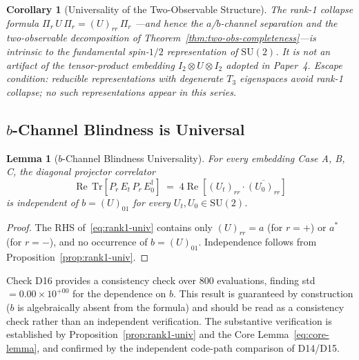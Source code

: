 \documentclass[12pt]{article}
\numberwithin{equation}{section}
\theoremstyle{plain}
\newtheorem{lemma}{Lemma}[section]
\newtheorem{corollary}{Corollary}[section]
\theoremstyle{definition}
\theoremstyle{remark}
\newcommand{\su}{\mathrm{SU}}              %
\newcommand{\tr}{\mathrm{Tr}}              %
\newcommand{\Pir}{\Pi_{r}}                 %
\begin{document}
	\begin{corollary}[Universality of the Two-Observable Structure]
		\label{cor:intrinsic}
		The rank-1 collapse formula $\Pir\, U\,\Pir = (U)_{rr}\,\Pir$
		---and hence the $a$/$b$-channel separation and the
		two-observable decomposition of
		Theorem~\ref{thm:two-obs-completeness}---is intrinsic to the
		fundamental spin-$1/2$ representation of $\su(2)$.  It is not an
		artifact of the tensor-product embedding $I_{2}\otimes U\otimes
		I_{2}$ adopted in Paper~4.
		\emph{Escape condition:} reducible representations with degenerate
		$T_{3}$ eigenspaces avoid rank-1 collapse; no such representations
		appear in this series.
	\end{corollary}
	
	\subsection{\texorpdfstring{$b$}{b}-Channel Blindness is Universal}
	\label{sec:b-blindness}
	
	\begin{lemma}[$b$-Channel Blindness Universality]
		\label{lem:b-blindness}
		For every embedding Case A, B, C, the diagonal projector
		correlator
		\[
		\operatorname{Re}\,\tr\!\left[P_{r}\, E_{t}\, P_{r}\,
		E_{0}^{\dagger}\right]
		\;=\; 4\operatorname{Re}\!\left[(U_{t})_{rr}\cdot
		\overline{(U_{0})_{rr}}\right]
		\]
		is independent of $b = (U)_{01}$ for every
		$U_t, U_0\in\su(2)$.
	\end{lemma}
	
	\begin{proof}
		The RHS of~\eqref{eq:rank1-univ} contains only $(U)_{rr} = a$
		(for $r = +$) or $a^{*}$ (for $r = -$), and no occurrence of
		$b = (U)_{01}$.  Independence follows from
		Proposition~\ref{prop:rank1-univ}.
	\end{proof}
	
	Check D16 provides a consistency check over $800$ evaluations,
	finding std $= 0.00\times 10^{+00}$ for the dependence on $b$.  This
	result is guaranteed by construction ($b$ is algebraically absent
	from the formula) and should be read as a consistency check rather
	than an independent verification.  The substantive verification is
	established by Proposition~\ref{prop:rank1-univ} and the Core
	Lemma~\eqref{eq:core-lemma}, and confirmed by the independent
	code-path comparison of D14/D15.
	
\end{document}
